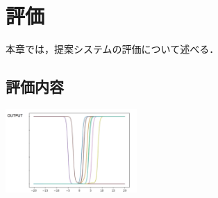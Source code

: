 \chapter{評価}
\label{evaluation}
本章では，提案システムの評価について述べる．

\section{評価内容}


\includegraphics[width=5cm]{asset/output.png}


